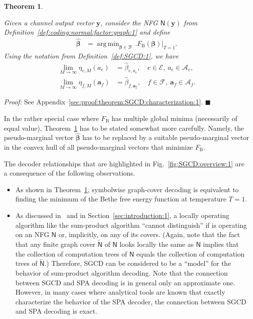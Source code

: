 \documentclass[journal, twocolumn]{IEEEtran}
\renewcommand{\mathbf}[1]{{\bm{#1}}}
\newcommand{\vect}[1]{\mathbf{#1}}
\newcommand{\set}[1]{\mathcal{#1}}
\newcommand{\graph}[1]{\mathsf{#1}}
\DeclareMathOperator*{\argmin}{arg\,min}
\newcommand{\bel}{\beta}
\newcommand{\hbel}{\hat \bel}
\newcommand{\vbel}{\boldsymbol{\bel}}
\newcommand{\hvbel}{\boldsymbol{\hat \bel}}
\newcommand{\setA}{\set{A}}
\newcommand{\setE}{\set{E}}
\newcommand{\setF}{\set{F}}
\newcommand{\va}{\vect{a}}
\newcommand{\vy}{\vect{y}}
\newcommand{\lmpB}{\mathcal{B}}
\newcommand{\graphN}{\graph{N}}
\newcommand{\FBethe}{F_{\mathrm{B}}}
\newcommand{\cover}[1]{\tilde{#1}}
\newcommand{\cgraph}[1]{\cover{\graph{#1}}}
\newcommand{\?}{\mathrm{?}}
\newcommand{\qedblack}{\hspace*{\fill}%
  $\blacksquare$\smallskip}
\newtheorem{Theorem}[Lemma]{Theorem}
\newenvironment{Proof}%
  {\noindent \emph{Proof:}}{\qedblack}
\begin{document}
\begin{Theorem}
  \label{theorem:SGCD:characterization:1}

  Given a channel output vector $\vy$, consider the NFG
  $\graphN(\vy)$ from Definition~\ref{def:coding:normal:factor:graph:1} and
  define
  \begin{align*}
    \hvbel
      &= \argmin_{\vbel \in \lmpB} \,
           \Big.
             \FBethe(\vbel)
           \Big|_{T = 1}.
  \end{align*}
  Using the notation from Definition~\ref{def:SGCD:1}, we have
  \begin{align*}
    \lim_{M \to \infty}
      \eta_{e,M}(a_e)
      &= \hbel_{e,a_e},
           \quad e \in \setE, \ a_e \in \setA_e, \\
    \lim_{M \to \infty}
      \eta_{f,M}(\va_f)
      &= \hbel_{f,\va_f},
           \quad f \in \setF, \ \va_f \in \setA_f.
  \end{align*}
\end{Theorem}


\begin{Proof}
  See Appendix~\ref{sec:proof:theorem:SGCD:characterization:1}.
\end{Proof}


In the rather special case where $\FBethe$ has multiple global minima
(necessarily of equal value), Theorem~\ref{theorem:SGCD:characterization:1}
has to be stated somewhat more carefully. Namely, the pseudo-marginal vector
$\hvbel$ has to be replaced by a suitable pseudo-marginal vector in the convex
hull of all pseudo-marginal vectors that minimize $\FBethe$.

The decoder relationships that are highlighted in
Fig.~\ref{fig:SGCD:overview:1} are a consequence of the following
observations.
\begin{itemize}

\item As shown in Theorem~\ref{theorem:SGCD:characterization:1}, symbolwise
  graph-cover decoding is equivalent to finding the minimum of the Bethe free
  energy function at temperature $T = 1$.

\item As discussed in~\cite{Koetter:Vontobel:03:1, Vontobel:Koetter:05:1:subm}
  and in Section~\ref{sec:introduction:1}, a locally operating algorithm like
  the sum-product algorithm ``cannot distinguish'' if is operating on an NFG
  $\graphN$ or, implicitly, on any of its covers. (Again, note that the fact
  that any finite graph cover $\cgraph{N}$ of $\graphN$ looks locally the same
  as $\graphN$ implies that the collection of computation trees of $\graphN$
  equals the collection of computation trees of $\cgraph{N}$.) Therefore, SGCD
  can be considered to be a ``model'' for the behavior of sum-product
  algorithm decoding. Note that the connection between SGCD and SPA decoding
  is in general only an approximate one. However, in many cases where
  analytical tools are known that exactly characterize the behavior of the SPA
  decoder, the connection between SGCD and SPA decoding is exact.

\end{itemize}
\end{document}
